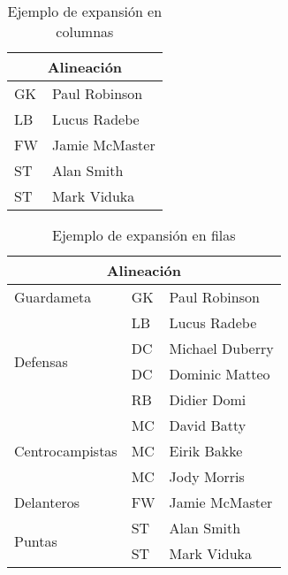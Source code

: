 \documentclass[11pt,a4paper]{article}
\begin{document}
\begin{table}[H]%
	\centering
	\caption{Ejemplo de expansión en columnas}
	\label{tab:expcolumnas}
	\begin{tabular}{|l|l|} %
	\hline
	\multicolumn{2}{|c|}{Alineación} \\
	\hline
	GK & Paul Robinson \\
	LB & Lucus Radebe \\
	FW & Jamie McMaster \\
	ST & Alan Smith \\
	ST & Mark Viduka \\
	\hline
	\end{tabular}
\end{table}

\begin{table}[H]%
	\centering
	\caption{Ejemplo de expansión en filas}
	\label{tab:expfilas}
	\begin{tabular}{|l|l|l|} %
	\hline
	\multicolumn{3}{|c|}{Alineación} \\
	\hline
	Guardameta & GK & Paul Robinson \\ \hline
	\multirow{4}{*}{Defensas} & LB & Lucus Radebe \\
	 & DC & Michael Duberry \\
	 & DC & Dominic Matteo \\
	 & RB & Didier Domi \\ \hline
	\multirow{3}{*}{Centrocampistas} & MC & David Batty \\
	 & MC & Eirik Bakke \\
	 & MC & Jody Morris \\ \hline
	Delanteros & FW & Jamie McMaster \\ \hline
	\multirow{2}{*}{Puntas} & ST & Alan Smith \\
	 & ST & Mark Viduka \\
	\hline
	\end{tabular}
\end{table}
\end{document}
